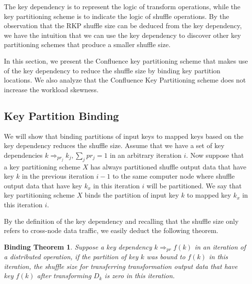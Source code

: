 \documentclass[10pt,journal,compsoc]{IEEEtran}
\begin{document}
The key dependency is to represent the logic of transform operations, 
while the key partitioning scheme is to indicate the logic of shuffle operations. 
By the observation that the RKP shuffle size can be deduced from the key dependency, we have the intuition that we can
use the key dependency to discover other key partitioning schemes that produce a smaller shuffle size. 

In this section, we present the Confluence key partitioning scheme
that makes use of the key dependency to reduce the shuffle size by binding 
key partition locations. 
We also analyze that the Confluence Key Partitioning scheme does not 
increase the workload skewness.


\subsection{Key Partition Binding}\label{section:binding}
We will show that binding partitions of input keys to mapped keys based on the key dependency reduces the shuffle size.
Assume that we have a set of key 
dependencies $k \Rightarrow_{pr_j} k_j, \sum_{j} pr_j = 1$ in an arbitrary iteration $i$. 
Now suppose that a key partitioning scheme $X$ has always partitioned
shuffle output data that have key $k$ in the previous iteration $i-1$ to the same computer node where 
shuffle output data that have key $k_x$ in this iteration $i$ will be partitioned. 
We say that key partitioning scheme $X$ binds the partition of 
input key $k$ to mapped key $k_x$ in this iteration $i$. 

By the definition of the key dependency and recalling that 
the shuffle size only refers to cross-node data traffic,
we easily deduct the following theorem.
\newtheorem*{theorem*}{\textbf{Binding Theorem}}
\begin{theorem*}\label{thm:binding}
Suppose a key dependency $k \Rightarrow_{pr} f(k)$ in an iteration of a distributed operation,
if the partition of key $k$ was bound to $f(k)$ in this iteration, 
the shuffle size for transferring transformation output data that have key $f(k)$ after transforming $D_k$ is zero in this iteration.
\end{theorem*}
\end{document}
